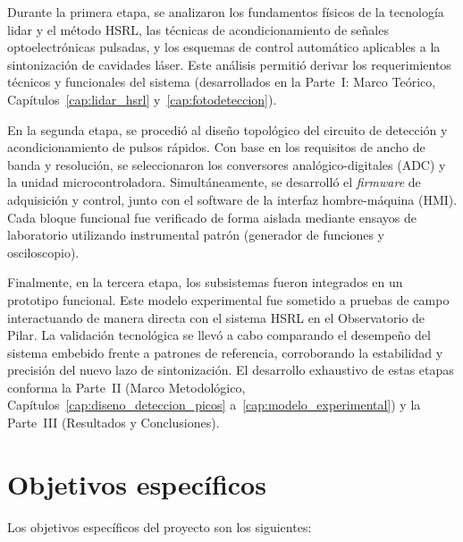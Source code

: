 Durante la primera etapa, se analizaron los fundamentos físicos de la tecnología lidar y el método HSRL, las técnicas de acondicionamiento de señales optoelectrónicas pulsadas, y los esquemas de control automático aplicables a la sintonización de cavidades láser. Este análisis permitió derivar los requerimientos técnicos y funcionales del sistema (desarrollados en la Parte~I: Marco Teórico, Capítulos~\ref{cap:lidar_hsrl} y~\ref{cap:fotodeteccion}).

En la segunda etapa, se procedió al diseño topológico del circuito de detección y acondicionamiento de pulsos rápidos. Con base en los requisitos de ancho de banda y resolución, se seleccionaron los conversores analógico-digitales (ADC) y la unidad microcontroladora. Simultáneamente, se desarrolló el \emph{firmware} de adquisición y control, junto con el software de la interfaz hombre-máquina (HMI). Cada bloque funcional fue verificado de forma aislada mediante ensayos de laboratorio utilizando instrumental patrón (generador de funciones y osciloscopio).

Finalmente, en la tercera etapa, los subsistemas fueron integrados en un prototipo funcional. Este modelo experimental fue sometido a pruebas de campo interactuando de manera directa con el sistema HSRL en el Observatorio de Pilar. La validación tecnológica se llevó a cabo comparando el desempeño del sistema embebido frente a patrones de referencia, corroborando la estabilidad y precisión del nuevo lazo de sintonización. El desarrollo exhaustivo de estas etapas conforma la Parte~II (Marco Metodológico, Capítulos~\ref{cap:diseno_deteccion_picos} a~\ref{cap:modelo_experimental}) y la Parte~III (Resultados y Conclusiones).

\section{Objetivos específicos}
\label{sec:objetivos_especificos}

Los objetivos específicos del proyecto son los siguientes:

